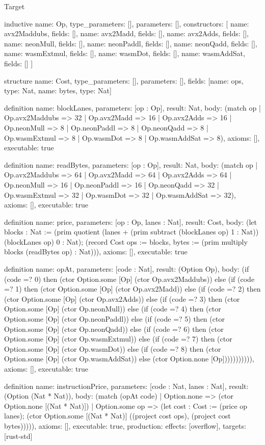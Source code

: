 \begin{lexlean}{Target}
\begin{semanticmodule}
inductive{
  name: Op,
  type_parameters: [],
  parameters: [],
  constructors: [
    {name: avx2Maddubs, fields: []},
    {name: avx2Madd, fields: []},
    {name: avx2Adds, fields: []},
    {name: neonMull, fields: []},
    {name: neonPaddl, fields: []},
    {name: neonQadd, fields: []},
    {name: wasmExtmul, fields: []},
    {name: wasmDot, fields: []},
    {name: wasmAddSat, fields: []}
  ]
}

structure{
  name: Cost,
  type_parameters: [],
  parameters: [],
  fields: [{name: ops, type: Nat}, {name: bytes, type: Nat}]
}

definition{
  name: blockLanes,
  parameters: [op : Op],
  result: Nat,
  body: (match op
    | Op.avx2Maddubs => 32
    | Op.avx2Madd => 16
    | Op.avx2Adds => 16
    | Op.neonMull => 8
    | Op.neonPaddl => 8
    | Op.neonQadd => 8
    | Op.wasmExtmul => 8
    | Op.wasmDot => 8
    | Op.wasmAddSat => 8),
  axioms: [],
  executable: true
}

definition{
  name: readBytes,
  parameters: [op : Op],
  result: Nat,
  body: (match op
    | Op.avx2Maddubs => 64
    | Op.avx2Madd => 64
    | Op.avx2Adds => 64
    | Op.neonMull => 16
    | Op.neonPaddl => 16
    | Op.neonQadd => 32
    | Op.wasmExtmul => 32
    | Op.wasmDot => 32
    | Op.wasmAddSat => 32),
  axioms: [],
  executable: true
}

definition{
  name: price,
  parameters: [op : Op, lanes : Nat],
  result: Cost,
  body: (let blocks : Nat := (prim quotient (lanes + (prim subtract (blockLanes op) 1 : Nat)) (blockLanes op) 0 : Nat); (record Cost {ops := blocks, bytes := (prim multiply blocks (readBytes op) : Nat)})),
  axioms: [],
  executable: true
}

definition{
  name: opAt,
  parameters: [code : Nat],
  result: (Option Op),
  body: (if (code =? 0) then (ctor Option.some [Op] (ctor Op.avx2Maddubs)) else (if (code =? 1) then (ctor Option.some [Op] (ctor Op.avx2Madd)) else (if (code =? 2) then (ctor Option.some [Op] (ctor Op.avx2Adds)) else (if (code =? 3) then (ctor Option.some [Op] (ctor Op.neonMull)) else (if (code =? 4) then (ctor Option.some [Op] (ctor Op.neonPaddl)) else (if (code =? 5) then (ctor Option.some [Op] (ctor Op.neonQadd)) else (if (code =? 6) then (ctor Option.some [Op] (ctor Op.wasmExtmul)) else (if (code =? 7) then (ctor Option.some [Op] (ctor Op.wasmDot)) else (if (code =? 8) then (ctor Option.some [Op] (ctor Op.wasmAddSat)) else (ctor Option.none [Op])))))))))),
  axioms: [],
  executable: true
}

definition{
  name: instructionPrice,
  parameters: [code : Nat, lanes : Nat],
  result: (Option (Nat * Nat)),
  body: (match (opAt code)
    | Option.none => (ctor Option.none [(Nat * Nat)])
    | Option.some op => (let cost : Cost := (price op lanes); (ctor Option.some [(Nat * Nat)] ((project cost ops), (project cost bytes))))),
  axioms: [],
  executable: true,
  production: {effects: [overflow], targets: [rust-std]}
}


\end{semanticmodule}
\end{lexlean}

